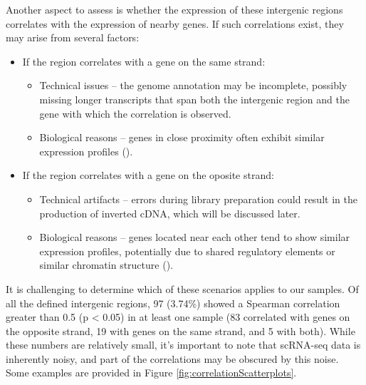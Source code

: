 Another aspect to assess is whether the expression of these intergenic regions correlates with the expression of nearby genes.
If such correlations exist, they may arise from several factors:
\begin{itemize}
  \item If the region correlates with a gene on the same strand:
  \begin{itemize}
    \item Technical issues – the genome annotation may be incomplete, possibly missing longer transcripts that span both the intergenic region and the gene with which the correlation is observed.
    \item Biological reasons – genes in close proximity often exhibit similar expression profiles (\cite{Dong2024}).
  \end{itemize}
  \item If the region correlates with a gene on the oposite strand:
  \begin{itemize}
    \item Technical artifacts – errors during library preparation could result in the production of inverted cDNA,
    which will be discussed later.
    \item Biological reasons – genes located near each other tend to show similar expression profiles,
    potentially due to shared regulatory elements or similar chromatin structure (\cite{Zinani2022}).
  \end{itemize}
\end{itemize}

It is challenging to determine which of these scenarios applies to our samples.
Of all the defined intergenic regions, 97 (3.74\%) showed a Spearman correlation greater than 0.5 (p < 0.05)
in at least one sample (83 correlated with genes on the opposite strand, 19 with genes on the same strand, and 5 with both).
While these numbers are relatively small, it's important to note that scRNA-seq data is inherently noisy,
and part of the correlations may be obscured by this noise.
Some examples are provided in Figure \ref{fig:correlationScatterplots}.

